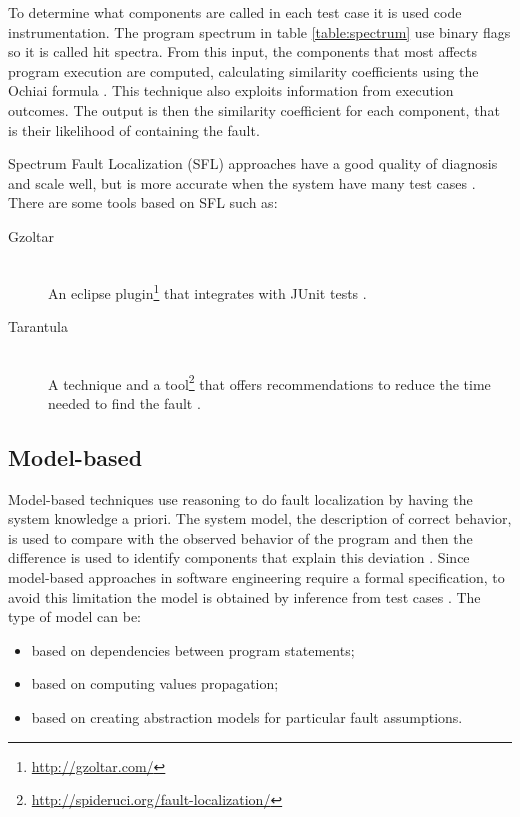 To determine what components are called in each test case it is used code
instrumentation. The program spectrum in table \ref{table:spectrum} use binary
flags so it is called hit spectra. From this input, the components that most
affects program execution are computed, calculating similarity coefficients
using the Ochiai formula \cite{Abreu:2009:SMF:1747491.1747511}. This technique
also exploits information from execution outcomes. The output is then the
similarity coefficient for each component, that is their likelihood of
containing the fault.

Spectrum Fault Localization (SFL) approaches have a good quality of diagnosis
and scale well, but is more accurate when the system have many test cases
\cite{Mayer2008}. There are some tools based on SFL such as:

\begin{description}
  \item[Gzoltar] \hfill \\
  An eclipse plugin\footnote{\url{http://gzoltar.com/}} that integrates with
  JUnit tests \cite{Campos:2012:GEP:2351676.2351752}.
  \item[Tarantula] \hfill \\
  A technique and a tool\footnote{\url{http://spideruci.org/fault-localization/}}
  that offers recommendations to reduce the time needed to find the fault
  \cite{jones05}.
\end{description}

\subsection{Model-based}
Model-based techniques use reasoning to do fault localization by having the
system knowledge a priori. The system model, the description of correct
behavior, is used to compare with the observed behavior of the program and then
the difference is used to identify components that explain this deviation
\cite{Mayer2008}. Since model-based approaches in software engineering require a
formal specification, to avoid this limitation the model is obtained by
inference from test cases \cite{Perez2004}. The type of model can be:

\begin{itemize}
  \item based on dependencies between program statements;
  \item based on computing values propagation;
  \item based on creating abstraction models for particular fault assumptions.
\end{itemize}

